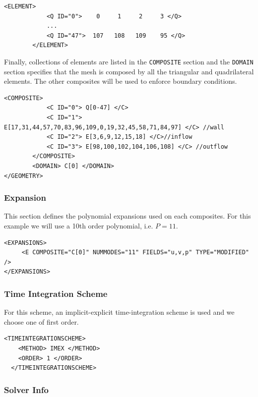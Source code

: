   \begin{lstlisting}[style=XMLStyle]
        <ELEMENT>
            <Q ID="0">    0     1     2     3 </Q>
            ...
            <Q ID="47">  107   108   109    95 </Q>
        </ELEMENT>
        \end{lstlisting}

Finally, collections of elements are listed in the \texttt{COMPOSITE} section and the \texttt{DOMAIN} section specifies that the mesh is composed by all the triangular and quadrilateral elements. The other composites will be used to enforce boundary conditions.

  \begin{lstlisting}[style=XMLStyle]
              <COMPOSITE>
            <C ID="0"> Q[0-47] </C>
            <C ID="1"> E[17,31,44,57,70,83,96,109,0,19,32,45,58,71,84,97] </C> //wall
            <C ID="2"> E[3,6,9,12,15,18] </C>//inflow
            <C ID="3"> E[98,100,102,104,106,108] </C> //outflow
        </COMPOSITE>
        <DOMAIN> C[0] </DOMAIN>
</GEOMETRY>
  \end{lstlisting}

  \subsubsection{Expansion}

  This section defines the polynomial expansions used on each composites. For this example we will use a 10th order polynomial, i.e. $P=11$.

  \begin{lstlisting}[style=XMLStyle]
<EXPANSIONS>
     <E COMPOSITE="C[0]" NUMMODES="11" FIELDS="u,v,p" TYPE="MODIFIED" />
</EXPANSIONS>
  \end{lstlisting}

  \subsubsection{Time Integration Scheme}

For this scheme, an implicit-explicit time-integration scheme is used
and we choose one of first order.

    \begin{lstlisting}[style=XMLStyle]
  <TIMEINTEGRATIONSCHEME>
    <METHOD> IMEX </METHOD>
    <ORDER> 1 </ORDER>
  </TIMEINTEGRATIONSCHEME>
      \end{lstlisting}
    
  \subsubsection{Solver Info}

